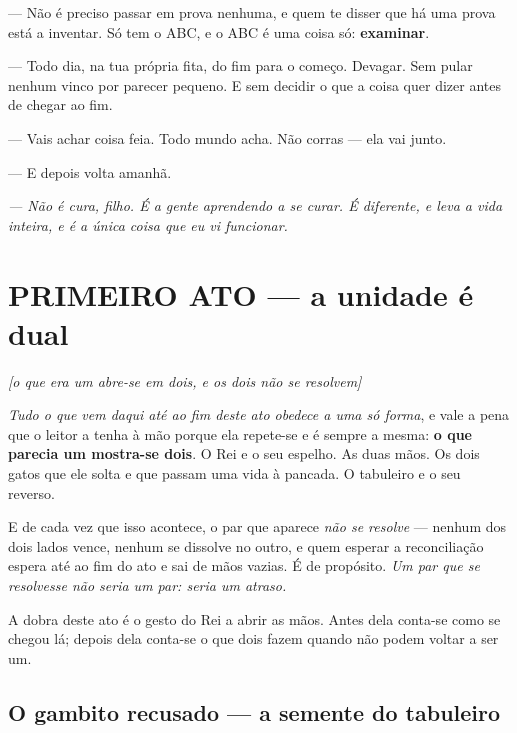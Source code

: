\documentclass[livro.tex]{subfiles}
\begin{document}
--- Não é preciso passar em prova nenhuma, e quem te disser que há uma prova está a inventar. Só
tem o ABC, e o ABC é uma coisa só: \textbf{examinar}.

--- Todo dia, na tua própria fita, do fim para o começo. Devagar. Sem pular nenhum vinco por
parecer pequeno. E sem decidir o que a coisa quer dizer antes de chegar ao fim.

--- Vais achar coisa feia. Todo mundo acha. Não corras --- ela vai junto.

--- E depois volta amanhã.

\medskip

\begin{center}
\emph{--- Não é cura, filho. É a gente aprendendo a se curar. É diferente, e leva a vida
inteira, e é a única coisa que eu vi funcionar.}
\end{center}



\part*{PRIMEIRO ATO --- a unidade é dual}
\noindent\hfill\emph{\small[o que era um abre-se em dois, e os dois não se resolvem]}\medskip

\noindent \emph{Tudo o que vem daqui até ao fim deste ato obedece a uma só forma}, e vale a pena
que o leitor a tenha à mão porque ela repete-se e é sempre a mesma: \textbf{o que parecia um
mostra-se dois}. O Rei e o seu espelho. As duas mãos. Os dois gatos que ele solta e que passam
uma vida à pancada. O tabuleiro e o seu reverso.

\medskip
\noindent E de cada vez que isso acontece, o par que aparece \emph{não se resolve} --- nenhum dos
dois lados vence, nenhum se dissolve no outro, e quem esperar a reconciliação espera até ao fim do
ato e sai de mãos vazias. É de propósito. \emph{Um par que se resolvesse não seria um par: seria
um atraso.}

\medskip
\noindent A dobra deste ato é o gesto do Rei a abrir as mãos. Antes dela conta-se como se chegou
lá; depois dela conta-se o que dois fazem quando não podem voltar a ser um.




\chapter{O gambito recusado --- a semente do tabuleiro}
\end{document}
